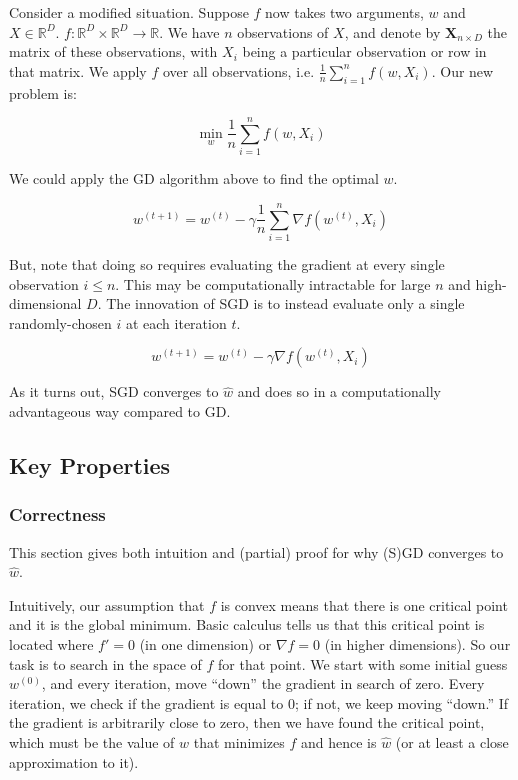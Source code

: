 \documentclass{article}
\begin{document}
Consider a modified situation. Suppose $f$ now takes two arguments, $w$ and $X
\in \mathbb{R}^D$. $f : \mathbb{R}^D \times \mathbb{R}^D \rightarrow
\mathbb{R}$. We have $n$ observations of $X$, and denote by
$\bm{X}_{n \times D}$ the matrix of these observations, with $X_i$ being a
particular observation or row in that matrix. We apply
$f$ over all observations, i.e. $\frac{1}{n} \sum_{i=1}^n f(w, X_i)$. Our new
problem is:

\begin{equation}
	\min_w  \frac{1}{n} \sum_{i=1}^n f(w, X_i)
\end{equation}

We could apply the GD algorithm above to find the optimal $w$.

\begin{equation}
	w^{(t+1)} = w^{(t)} - \gamma \frac{1}{n} \sum_{i=1}^n \nabla f(w^{(t)},
	X_i)
\end{equation}

But, note that doing so requires evaluating the gradient at every single
observation $i \leq n$. This may be computationally intractable for large $n$
and high-dimensional $D$. The innovation of SGD is to instead evaluate only a
single randomly-chosen $i$ at each iteration $t$.

\begin{equation}
	w^{(t+1)} = w^{(t)} - \gamma \nabla f(w^{(t)}, X_i)
\end{equation}

As it turns out, SGD converges to $\hat{w}$ and does so in a computationally
advantageous way compared to GD.

\subsection{Key Properties}

\subsubsection{Correctness}

This section gives both intuition and (partial) proof for why (S)GD converges to
$\hat{w}$.

Intuitively, our assumption that $f$ is convex means that there is one critical
point and it is the global minimum. Basic calculus tells us that this critical
point is located where $f'=0$ (in one dimension) or $\nabla f = 0$ (in higher
dimensions). So our task is to search in the space of $f$ for that point. We
start with some initial guess $w^{(0)}$, and every iteration, move ``down'' the
gradient in search of zero. Every iteration, we check if the gradient is equal
to 0; if not, we keep moving ``down.'' If the gradient is arbitrarily close to
zero, then we have found the critical point, which must be the value of $w$ that
minimizes $f$ and hence is $\hat{w}$ (or at least a close approximation to it).
\end{document}
